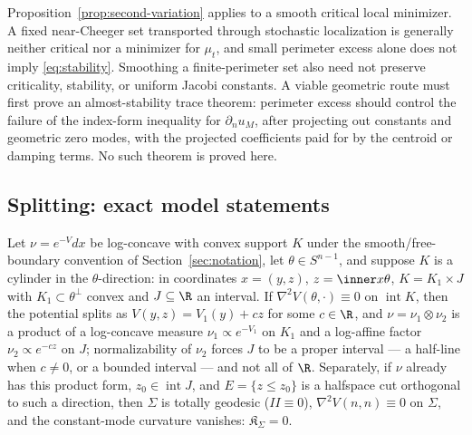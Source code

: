 \documentclass[../../main.tex]{subfiles}
\begin{document}
\begin{question}
\label{rem:almost-stability-gap}
Proposition~\ref{prop:second-variation} applies to a smooth critical local minimizer. A fixed
near-Cheeger set transported through stochastic localization is generally neither critical nor a
minimizer for $\mu_t$, and small perimeter excess alone does not imply
\eqref{eq:stability}. Smoothing a finite-perimeter set also need not preserve criticality,
stability, or uniform Jacobi constants. A viable geometric route must first prove an
almost-stability trace theorem: perimeter excess should control the failure of the index-form
inequality for $\partial_nu_M$, after projecting out constants and geometric zero modes, with
the projected coefficients paid for by the centroid or damping terms. No such theorem is proved
here.
\end{question}

\subsection{Splitting: exact model statements}

\begin{proposition}
\label{prop:exact-splitting}
Let $\nu=e^{-V}dx$ be log-concave with convex support $K$ under the smooth/free-boundary
convention of Section~\ref{sec:notation}, let $\theta\in S^{n-1}$, and suppose
$K$ is a cylinder in the $\theta$-direction: in coordinates $x=(y,z)$, $z=\inner x\theta$,
$K=K_1\times J$ with $K_1\subset\theta^\perp$ convex and $J\subseteq\R$ an interval. If
$\nabla^2V(\theta,\cdot)\equiv0$ on $\operatorname{int}K$, then the potential splits as
$V(y,z)=V_1(y)+cz$ for some $c\in\R$, and $\nu=\nu_1\otimes\nu_2$ is a product of a log-concave
measure $\nu_1\propto e^{-V_1}$ on $K_1$ and a log-affine factor $\nu_2\propto e^{-cz}$ on $J$;
normalizability of $\nu_2$ forces $J$ to be a proper interval --- a half-line when $c\ne0$, or a
bounded interval --- and not all of $\R$. Separately, if $\nu$ already has this product form,
$z_0\in\operatorname{int}J$, and $E=\{z\le z_0\}$ is a halfspace cut
orthogonal to such a direction, then $\Sigma$ is totally geodesic ($II\equiv0$),
$\nabla^2V(n,n)\equiv0$ on $\Sigma$, and the constant-mode curvature vanishes:
$\mathfrak K_\Sigma=0$.
\end{proposition}
\end{document}
